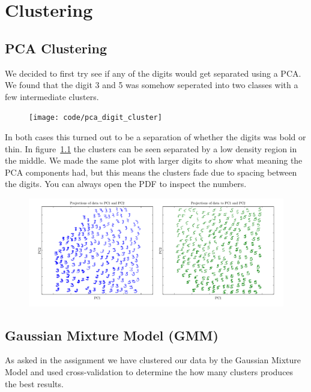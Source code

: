 \chapter{Clustering}


\section{PCA Clustering}
We decided to first try see if any of the digits would get separated using a PCA. We found that the digit 3 and 5 was somehow seperated into two classes with a few intermediate clusters.

\begin{figure}[H]
\centering
\texttt{[image: code/pca\_digit\_cluster]}
\caption{}
\label{fig:pca_cluster}
\end{figure}

In both cases this turned out to be a separation of whether the digits was bold or thin. In figure~\ref{fig:pca_cluster} the clusters can be seen separated by a low density region in the middle. We made the same plot with larger digits to show what meaning the PCA components had, but this means the clusters fade due to spacing between the digits. You can always open the PDF to inspect the numbers.

\begin{figure}[H]
\centering
\includegraphics[width=1\linewidth]{code/pca_digit_cluster_z}
\caption{}
\label{fig:pca_cluster_zoom}
\end{figure}


\section{Gaussian Mixture Model (GMM)}

As asked in the assignment we have clustered our data by the Gaussian Mixture Model and used cross-validation to determine the how many clusters produces the best results. \\

